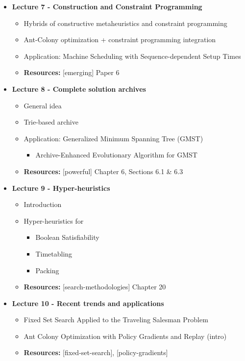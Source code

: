 \documentclass{article}
\begin{document}
\begin{itemize}
    \item \textbf{Lecture 7 - Construction and Constraint Programming}
    \begin{itemize}
        \item Hybrids of constructive metaheuristics and constraint programming
        \item Ant-Colony optimization + constraint programming integration
        \item Application: Machine Scheduling with Sequence-dependent Setup Times
        \item \textbf{Resources:} [emerging] Paper 6
    \end{itemize}

    \item \textbf{Lecture 8 - Complete solution archives}
    \begin{itemize}
        \item General idea
        \item Trie-based archive
        \item Application: Generalized Minimum Spanning Tree (GMST)
        \begin{itemize}
            \item Archive-Enhanced Evolutionary Algorithm for GMST
        \end{itemize}
        \item \textbf{Resources:} [powerful] Chapter 6, Sections 6.1 \& 6.3
    \end{itemize}

    \item \textbf{Lecture 9 - Hyper-heuristics}
    \begin{itemize}
        \item Introduction
        \item Hyper-heuristics for
        \begin{itemize}
            \item Boolean Satisfiability
            \item Timetabling
            \item Packing
        \end{itemize}
        \item \textbf{Resources:} [search-methodologies] Chapter 20
    \end{itemize}

    \item \textbf{Lecture 10 - Recent trends and applications}
    \begin{itemize}
        \item Fixed Set Search Applied to the Traveling Salesman Problem
        \item Ant Colony Optimization with Policy Gradients and Replay (intro)
        \item \textbf{Resources:} [fixed-set-search], [policy-gradients]
    \end{itemize}


\end{itemize}
\end{document}
